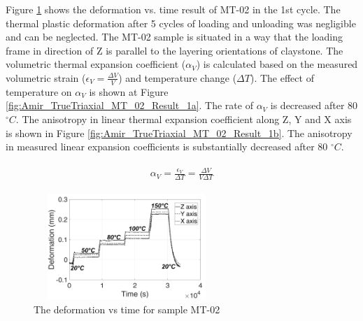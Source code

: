 Figure \ref{fig:Amir_TrueTriaxial_MT_02_Result} shows the deformation vs. time result of MT-02 in the 1st cycle. The thermal plastic deformation after 5 cycles of loading and unloading was negligible and can be neglected. The MT-02 sample is situated in a way that the loading frame in direction of Z is parallel to the layering orientations of claystone. The volumetric thermal expansion coefficient ($\alpha_V$) is calculated based on the measured volumetric strain ($\epsilon_V=\frac{\Delta V}{V}$) and temperature change ($\Delta T$). The effect of temperature on $\alpha_V$ is shown at Figure \ref{fig:Amir_TrueTriaxial_MT_02_Result_1a}. The rate of $\alpha_V$ is decreased after 80 $^{\circ}C$. The anisotropy in linear thermal expansion coefficient along Z, Y and X axis is shown in Figure \ref{fig:Amir_TrueTriaxial_MT_02_Result_1b}. The anisotropy in measured linear expansion coefficients is substantially decreased after 80 $^{\circ}C$.

\begin{align}
\label{eq:ThermalExpansion}
\begin{split}
\alpha_V=\frac{\epsilon_V}{\Delta T}=\frac{\Delta V}{V\Delta T}
\end{split}
\end{align}

\begin{figure}[!ht]
\centering
\includegraphics[width=7cm,height=4cm]{figures/Amir_TrueTriaxial_MT_02_Result.png}
\caption{The deformation vs time for sample MT-02}
\label{fig:Amir_TrueTriaxial_MT_02_Result}
\end{figure} 

